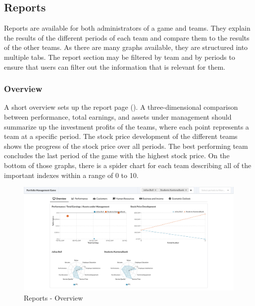 \subsection{Reports}
\label{subsec:reports}
Reports are available for both administrators of a game and teams. They explain the results of the different periods of each team and compare them to the results of the other teams. As there are many graphs available, they are structured into multiple tabs. The report section may be filtered by team and by periods to ensure that users can filter out the information that is relevant for them.

\subsubsection{Overview}
A short overview sets up the report page (). A three-dimensional comparison between performance, total earnings, and assets under management should summarize up the investment profits of the teams, where each point represents a team at a specific period. The stock price development of the different teams shows the progress of the stock price over all periods. The best performing team concludes the last period of the game with the highest stock price. On the bottom of those graphs, there is a spider chart for each team describing all of the important indexes within a range of 0 to 10.
\begin{figure}[h!]
  \centering
  \includegraphics[scale=0.2]{img/application-overview/reports/01_overview.png}
  \caption{Reports - Overview}
  \label{fig:reports_overview}
\end{figure}

